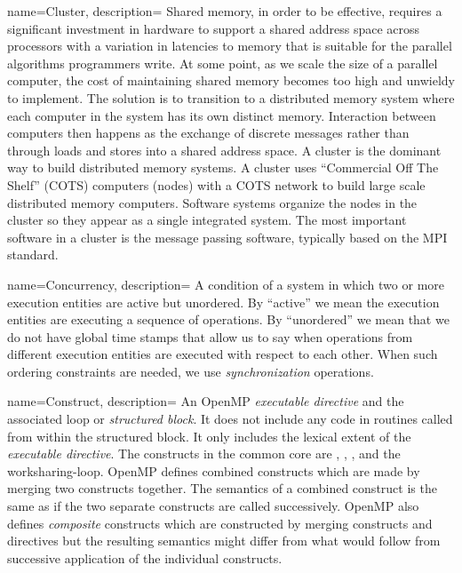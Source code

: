 {
   name={Cluster},
   description={
   Shared memory, in order to be effective, requires a significant investment in hardware to support 
   a shared address space across processors with a variation in latencies to memory that is
   suitable for the parallel algorithms programmers write. 
   At some point, as we scale the size
   of a parallel computer, the cost of maintaining shared memory becomes too high and unwieldy
   to implement.  The solution is to transition to a distributed memory system where each computer in 
   the system has its own distinct memory.  Interaction between computers then happens as the exchange
   of discrete messages rather than through loads and stores into a shared address space.    A cluster
   is the dominant way to build distributed memory systems.  A cluster uses ``Commercial Off The Shelf''
   (COTS) computers (nodes) with a COTS network to build large scale distributed memory computers.  Software
   systems organize the nodes in the cluster so they appear as a single integrated system.  The most important
   software in a cluster is the message passing software, typically based on the MPI standard.
   }
}   



{
   name={Concurrency},
   description={
   A condition of a system in which two or more execution entities are active but unordered.  By ``active'' we mean the
   execution entities are executing a sequence of operations.  By ``unordered'' we mean that we do not have 
   global time stamps that allow us to say when operations from different execution entities are executed with respect 
   to each other.  When such ordering constraints are needed, we use \emph{synchronization} operations.
      }
}   



{
   name={Construct},
   description={
An OpenMP \emph{executable directive} and the associated loop or \emph{structured block}.  It does not
include any code in routines called from within the structured block.  It only includes the lexical extent of 
the \emph{executable directive}.  The constructs in the common core are , 
, ,  and the worksharing-loop.  OpenMP defines combined constructs which
are made by merging two constructs together.  The semantics of a combined construct is the same as if 
the two separate constructs are called successively.  OpenMP also defines \emph{composite} constructs which
are constructed by merging constructs and directives but the resulting semantics might differ from what would follow
from successive application of the individual constructs. }
}

